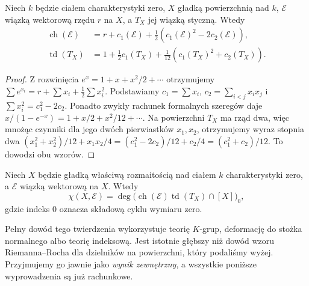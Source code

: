 \begin{lemat}
\label{lem:ga7-ch-td-surface}
Niech $k$ będzie ciałem charakterystyki zero,
$X$ gładką powierzchnią nad $k$,
$\mathcal E$ wiązką wektorową rzędu $r$ na $X$,
a $T_X$ jej wiązką styczną. Wtedy
\[
\begin{aligned}
\operatorname{ch}(\mathcal E)&=r+c_1(\mathcal E)
+\tfrac12(c_1(\mathcal E)^2-2c_2(\mathcal E)),\\
\operatorname{td}(T_X)&=1+\tfrac12 c_1(T_X)
+\tfrac1{12}(c_1(T_X)^2+c_2(T_X)).
\end{aligned}
\]
\end{lemat}
\begin{proof}
Z rozwinięcia $e^x=1+x+x^2/2+\cdots$ otrzymujemy
$\sum e^{x_i}=r+\sum x_i+\frac12\sum x_i^2$.
Podstawiamy
$c_1=\sum x_i$, $c_2=\sum_{i<j}x_ix_j$ i
$\sum x_i^2=c_1^2-2c_2$.
Ponadto zwykły rachunek formalnych szeregów daje
$x/(1-e^{-x})=1+x/2+x^2/12+\cdots$.
Na powierzchni $T_X$ ma rząd dwa, więc mnożąc
czynniki dla jego dwóch pierwiastków
$x_1,x_2$, otrzymujemy wyraz stopnia dwa
$(x_1^2+x_2^2)/12+x_1x_2/4
=(c_1^2-2c_2)/12+c_2/4=(c_1^2+c_2)/12$.
To dowodzi obu wzorów.
\end{proof}

\begin{twierdzenie}
\label{tw:ga7-hrr}
Niech $X$ będzie gładką właściwą rozmaitością nad
ciałem $k$ charakterystyki zero, a $\mathcal E$
wiązką wektorową na $X$. Wtedy
\[
\chi(X,\mathcal E)=\deg\bigl(
\operatorname{ch}(\mathcal E)\operatorname{td}(T_X)
\cap[X]\bigr)_{0},
\]
gdzie indeks $0$ oznacza składową cyklu wymiaru zero.
\end{twierdzenie}

\begin{uwaga}
Pełny dowód tego twierdzenia wykorzystuje
teorię $K$-grup, deformację do stożka normalnego
albo teorię indeksową. Jest istotnie
głębszy niż dowód wzoru Riemanna--Rocha dla dzielników
na powierzchni, który podaliśmy wyżej.
Przyjmujemy go jawnie jako \emph{wynik zewnętrzny},
a wszystkie poniższe wyprowadzenia są już rachunkowe.
\end{uwaga}

